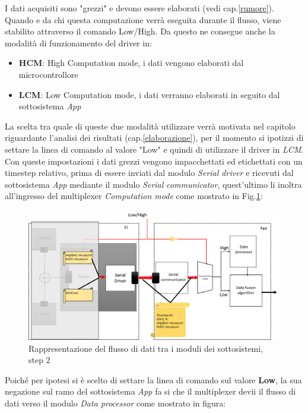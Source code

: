 I dati acquisiti sono "grezzi" e devono essere elaborati (vedi cap.\ref{rumore}). Quando e da chi questa computazione verrà eseguita durante il flusso, viene stabilito attraverso il comando Low/High. Da questo ne consegue anche la modalità di funzionamento del driver in:
\begin{itemize}
	\item \textbf{HCM}: High Computation mode, i dati vengono elaborati dal microcontrollore
	\item \textbf{LCM}: Low Computation mode, i dati verranno elaborati in seguito dal sottosistema \textit{App} 
\end{itemize}
La scelta tra quale di queste due modalità utilizzare verrà motivata nel capitolo riguardante l'analisi dei risultati (cap.\ref{elaborazione}), per il momento si ipotizzi di settare la linea di comando al valore "Low" e quindi di utilizzare il driver in \textit{LCM}. Con queste impostazioni i dati grezzi vengono impacchettati ed etichettati con un timestep relativo, prima di essere inviati dal modulo \textit{Serial driver} e ricevuti dal sottosistema \textit{App} mediante il modulo \textit{Serial communicator}, quest'ultimo li inoltra all'ingresso del multiplexer \textit{Computation mode} come mostrato in Fig.\ref{fig:flusso2}:
\begin{figure}[H]  
	\centering 
	\includegraphics[scale=0.25 ]{DescrizioneDelSistema/flusso2.png}
	\caption{Rappresentazione del flusso di dati tra i moduli dei sottosistemi, step 2}
	\label{fig:flusso2}
\end{figure}
Poiché per ipotesi si è scelto di settare la linea di comando sul valore \textbf{Low}, la sua negazione sul ramo del sottosistema \textit{App} fa si che il multiplexer devii il flusso di dati verso il modulo \textit{Data processor} come mostrato in figura:
